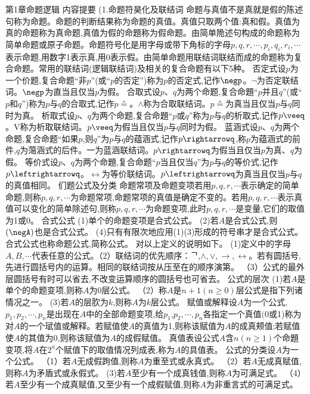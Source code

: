 {第1章命题逻辑}
{内容提要}
{(1.命题符昊化及联结词}
命题与真值不是真就是假的陈述句称为命题。命题的判断结果称为命题的真值。真值只取两个值:真和假。真值为真的命题称为真命题,真值为假的命題称为假命题。由简单陒述句构成的命题称为简单命题或原子命题。命题符号化是用字母或带下角标的字母$p,q,r,\cdots,p_{i},q_{i},r_{i},\cdots$表示命题,用数字1表示真,用0表示假。由简单命题用联结词联结而成的命题称为复合命题。常用的联结词(逻辑联结词)及相关的复合命题有以下5种。
否定式设$p$为一个价题,复合命题“非$p$”(或“$p$的否定”)称为$p$的否定式,记作$\negp$。$\neg$为否定联结词。$\negp$为直当且仅当$p$为假。
合取式设$p、q$为两个命题,复合命題“$p$并且$q$”(或“$p$和$q$”)称为$p$与$q$的合取式,记作$p\wedgeq$。$\wedge$称为合取联结词。$p\wedgeq$为真当且仅当$p$与$q$同时为真。
析取式设$p、q$为两个命题,复合命題“$p$或$q$”称为$p$与$q$的析取式,记作$p\veeq$。V称为析取联结词。$p\veeq$为假当且仅当$p$与$q$同时为假。
蓝涵式设$p、q$为两个命题,复合命题“如果$p$,则$q$”为$p$与$q$的蕴涵式,记作$p\rightarrowq$,称$p$为蕴涵式的前件,$q$为䔽涵式的后件。一为蓝涵联结词。$p\rightarrowq$为假当且仅当$p$为真、$q$为假。
等价式设$p、q$为两个命題,复合命题“$p$当且仅当$q$”为$p$与$q$的等价式,记作$p\leftrightarrowq$。$\leftrightarrow$为等价联结词。$p\leftrightarrowq$为真当且仅当$p$与$q$的真值相同。
们题公式及分类
命题常项及命题变项若用$p,q,r,\cdots$表示确定的简单命题,则称$p,q,r,\cdots$为命题常项,命题常项的真值是确定不变的。若用$p,q,r,\cdots$表示真值可以变化的简单除述句,则称$p,q,r,\cdots$为命题变项,此时$p,q,r,\cdots$是变量,它们的取值为1或0。
合式公式
(1)单个的命题变项是合式公式。
(2)若$A$是合式公式,则$(\negA)$也是合式公式。
(4)只有有限次地应用(1)(3)形成的符号串才是合式公式。合式公式也称命题公式,简称公式。
对以上定义的说明如下。
(1)定义中的字母$A,B,\cdots$代表任意的公式。（2）联结词的优先顺序：ᄀ,$\wedge,\vee,\rightarrow,\leftrightarrow$。若有圆括号,先进行圆括号内的运算。相同的联结词按从压至在的顺序演第。
（3）公式的最外层圆括号有时可以省去,不改变运算顺序的圆括号也可省去。
公式的层次
(1)若$A$是单个的命题变项,则称$A$为0层公式。
（2）称$A$是$n+1(n\geqslant0)$层公式是指下列诸情况之一。
(3)若$A$的层肷为$k$,则称$A$为$k$层公式。
赋值或解释设$A$为一个公式,$p_{1},p_{2},\cdots,p_{n}$是出现在$A$中的全部命题变项,给$p_{1}$,$p_{2},\cdots,p_{n}$各指定一个真值$(0$或1)称为对$A$的一个珷值或解释。若赋值使$A$的真值为1,则称该赋值为$A$的成真颊值;若赋值使$A$的其值为0,则称该赋值为$A$的成假赋值。
真值表设公式$A$含$n(n\geqslant1)$个命題变项,将$A$在$2^{n}$个赋值下的取值情况列成表,称为$A$的具值表。
公式的分类设$A$为一个公式。
（1）若$A$无成假跔值,则称$A$为重至式或永真式。
（2）若$A$无成真赋值,则称$A$为矛盾式或永假式。
(3)若$A$至少有一个成真钱值,则称$A$为可满足式。
（4）若$A$至少有一个成真赋值,又至少有一个成假赋值,则称$A$为非重言式的可满足式。
